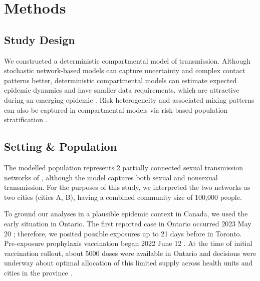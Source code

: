 \section{Methods}
\subsection{Study Design}
We constructed a deterministic compartmental model of \MPXV transmission.
Although stochastic network-based models can capture
uncertainty and complex contact patterns better,
deterministic compartmental models can estimate expected epidemic dynamics
and have smaller data requirements,
which are attractive during an emerging epidemic \cite{Johnson2016}.
Risk heterogeneity and associated mixing patterns can also be captured in
compartmental models via risk-based population stratification \cite{Garnett1996}.
\subsection{Setting \& Population}
The modelled population represents
2 partially connected sexual transmission networks of \GBMSM,
although the model captures both sexual and nonsexual transmission.
For the purposes of this study, we interpreted the two networks as two cities (cities A, B),
having a combined \GBMSM community size of 100,000 people.
\par
To ground our analyses in a plausible epidemic context in Canada,
we used the early \MPXV situation in Ontario.
The first reported case in Ontario occurred 2023 May 20 \cite{PHO2022ont};
therefore, we posited possible exposures up to 21 days before in Toronto.
Pre-exposure prophylaxis vaccination began 2022 June 12 \cite{TPH2022}.
At the time of initial vaccination rollout, about 5000 doses were available in Ontario
and decisions were underway about optimal allocation of this limited supply
across health units and cities in the province \cite{Mishra2022}.
